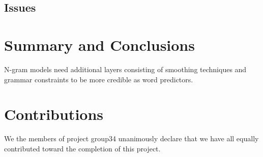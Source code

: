 \documentclass[a4paper,12pt]{article}
\begin{document}
\subsection{Issues}

\section{Summary and Conclusions}
\label{sec:summary}

N-gram models need additional layers consisting of smoothing techniques and grammar constraints to be more credible as word predictors.


\section{Contributions}
\label{sec:contributions}
We the members of project group34 unanimously declare that 
we have all equally contributed toward the completion of this
project. 




\end{document}
